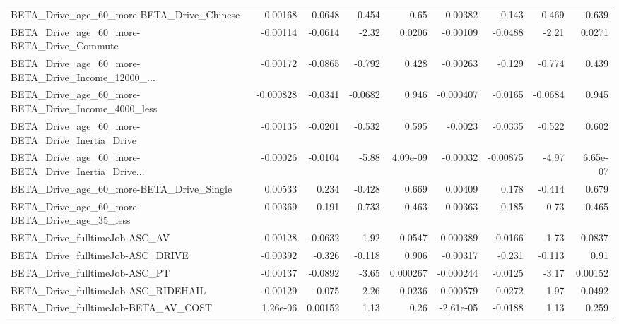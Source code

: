 \begin{tabular}{lrrrrrrrr}
BETA\_Drive\_age\_60\_more-BETA\_Drive\_Chinese          &     0.00168 &       0.0648 &    0.454 &     0.65 &    0.00382 &       0.143 &        0.469 &         0.639 \\
BETA\_Drive\_age\_60\_more-BETA\_Drive\_Commute          &    -0.00114 &      -0.0614 &    -2.32 &   0.0206 &   -0.00109 &     -0.0488 &        -2.21 &        0.0271 \\
BETA\_Drive\_age\_60\_more-BETA\_Drive\_Income\_12000\_... &    -0.00172 &      -0.0865 &   -0.792 &    0.428 &   -0.00263 &      -0.129 &       -0.774 &         0.439 \\
BETA\_Drive\_age\_60\_more-BETA\_Drive\_Income\_4000\_less &   -0.000828 &      -0.0341 &  -0.0682 &    0.946 &  -0.000407 &     -0.0165 &      -0.0684 &         0.945 \\
BETA\_Drive\_age\_60\_more-BETA\_Drive\_Inertia\_Drive    &    -0.00135 &      -0.0201 &   -0.532 &    0.595 &    -0.0023 &     -0.0335 &       -0.522 &         0.602 \\
BETA\_Drive\_age\_60\_more-BETA\_Drive\_Inertia\_Drive... &    -0.00026 &      -0.0104 &    -5.88 & 4.09e-09 &   -0.00032 &    -0.00875 &        -4.97 &      6.65e-07 \\
BETA\_Drive\_age\_60\_more-BETA\_Drive\_Single           &     0.00533 &        0.234 &   -0.428 &    0.669 &    0.00409 &       0.178 &       -0.414 &         0.679 \\
BETA\_Drive\_age\_60\_more-BETA\_Drive\_age\_35\_less      &     0.00369 &        0.191 &   -0.733 &    0.463 &    0.00363 &       0.185 &        -0.73 &         0.465 \\
BETA\_Drive\_fulltimeJob-ASC\_AV                      &    -0.00128 &      -0.0632 &     1.92 &   0.0547 &  -0.000389 &     -0.0166 &         1.73 &        0.0837 \\
BETA\_Drive\_fulltimeJob-ASC\_DRIVE                   &    -0.00392 &       -0.326 &   -0.118 &    0.906 &   -0.00317 &      -0.231 &       -0.113 &          0.91 \\
BETA\_Drive\_fulltimeJob-ASC\_PT                      &    -0.00137 &      -0.0892 &    -3.65 & 0.000267 &  -0.000244 &     -0.0125 &        -3.17 &       0.00152 \\
BETA\_Drive\_fulltimeJob-ASC\_RIDEHAIL                &    -0.00129 &       -0.075 &     2.26 &   0.0236 &  -0.000579 &     -0.0272 &         1.97 &        0.0492 \\
BETA\_Drive\_fulltimeJob-BETA\_AV\_COST                &    1.26e-06 &      0.00152 &     1.13 &     0.26 &  -2.61e-05 &     -0.0188 &         1.13 &         0.259 \\

\end{tabular}
